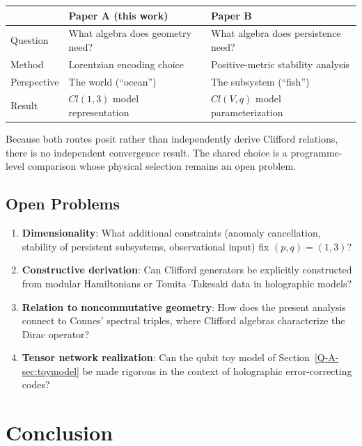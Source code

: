 \documentclass[12pt,a4paper,openany]{book}
\begin{document}
\begin{center}
\begin{tabular}{@{}lll@{}}
\toprule
& \textbf{Paper A (this work)} & \textbf{Paper B} \\
\midrule
Question & What algebra does geometry need? & What algebra does persistence need? \\
Method & Lorentzian encoding choice & Positive-metric stability analysis \\
Perspective & The world (``ocean'') & The subsystem (``fish'') \\
Result & $Cl(1,3)$ model representation & $Cl(V,q)$ model parameterization \\
\bottomrule
\end{tabular}
\end{center}

Because both routes posit rather than independently derive Clifford relations, there is no independent convergence result.  The shared choice is a programme-level comparison whose physical selection remains an open problem.

\subsection{Open Problems}

\begin{enumerate}
\item \textbf{Dimensionality}: What additional constraints (anomaly cancellation, stability of persistent subsystems, observational input) fix $(p,q) = (1,3)$?
\item \textbf{Constructive derivation}: Can Clifford generators be explicitly constructed from modular Hamiltonians or Tomita--Takesaki data in holographic models?
\item \textbf{Relation to noncommutative geometry}: How does the present analysis connect to Connes' spectral triples, where Clifford algebras characterize the Dirac operator?
\item \textbf{Tensor network realization}: Can the qubit toy model of Section~\ref{Q-A-sec:toymodel} be made rigorous in the context of holographic error-correcting codes?
\end{enumerate}

\section{Conclusion}
\end{document}
